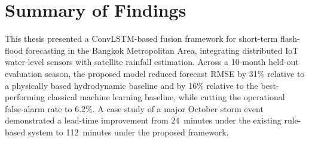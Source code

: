 \section{Summary of Findings}
This thesis presented a ConvLSTM-based fusion framework for short-term flash-flood forecasting in the Bangkok Metropolitan Area, integrating distributed IoT water-level sensors with satellite rainfall estimation. Across a 10-month held-out evaluation season, the proposed model reduced forecast RMSE by 31\% relative to a physically based hydrodynamic baseline and by 16\% relative to the best-performing classical machine learning baseline, while cutting the operational false-alarm rate to 6.2\%. A case study of a major October storm event demonstrated a lead-time improvement from 24~minutes under the existing rule-based system to 112~minutes under the proposed framework.

